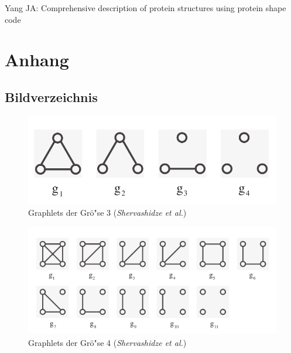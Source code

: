 \documentclass{report}
\begin{document}
Yang JA: Comprehensive description of protein structures using protein shape code




\chapter{Anhang}


\section{Bildverzeichnis}

\begin{figure}[h!]
\includegraphics[width =\linewidth]{3graphlets.pdf}
\caption{Graphlets der Gr\"o"se 3 (\textit{Shervashidze et al.})}
\label{fig:3graphlets}
\end{figure}

\begin{figure}[h!]
\includegraphics[width =\linewidth]{4graphlets.pdf}
\caption{Graphlets der Gr\"o"se 4 (\textit{Shervashidze et al.})}
\label{fig:4graphlets2}
\end{figure}

\newpage
\end{document}
